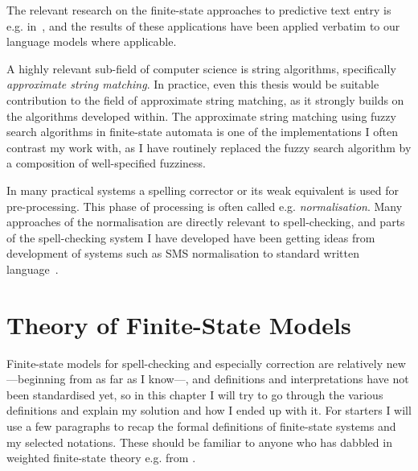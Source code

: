 \documentclass[officiallayout]{unihelcompling}
\begin{document}
The relevant research on the finite-state approaches to predictive text entry
is e.g. in~\citep{silfverberg2010partofspeech}, and the results of
these applications have been applied verbatim to our language models where
applicable.

A highly relevant sub-field of computer science is string algorithms,
specifically \emph{approximate string matching}. In practice, even this
thesis would be suitable contribution to the field of approximate string
matching, as it strongly builds on the algorithms developed within. The
approximate string matching using fuzzy search algorithms in finite-state
automata is one of the implementations I often contrast my work with, as
I have routinely replaced the fuzzy search algorithm by a composition of
well-specified fuzziness.

In many practical systems a spelling corrector or its weak equivalent is used
for pre-processing. This phase of processing is often called e.g. 
\emph{normalisation}. Many approaches of the normalisation are directly
relevant to spell-checking, and parts of the spell-checking system I have
developed have been getting ideas from development of systems such as SMS
normalisation to standard written language~\citep{kobus2008normalizing}.

\section{Theory of Finite-State Models}
\label{sec:finite-state-theory}

Finite-state models for spell-checking and especially correction are relatively
new---beginning from \citep{oflazer1996errortolerant} as far as I know---, and
definitions and interpretations have not been standardised yet, so in this
chapter I will try to go through the various definitions and explain my
solution and how I ended up with it. For starters I will use a few paragraphs
to recap the formal definitions of finite-state systems and my selected
notations. These should be familiar to anyone who has dabbled in weighted
finite-state theory e.g. from \citet{aho2007compilers,mohri1997finitestate}.
\end{document}

